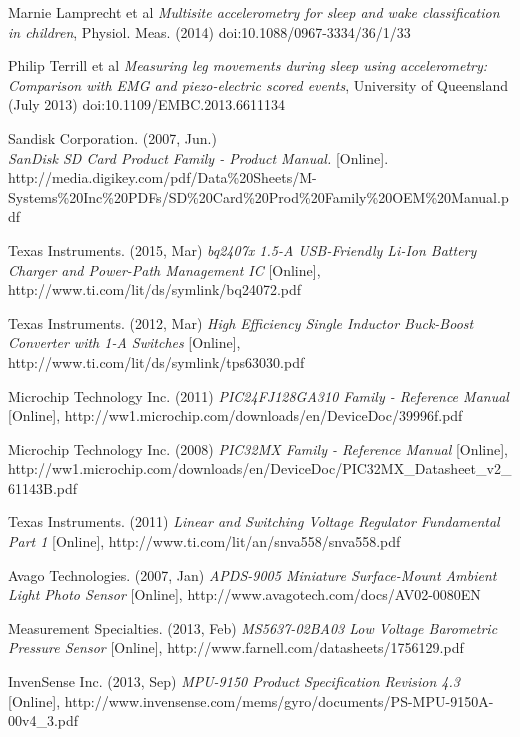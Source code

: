 \documentclass[12pt,openany,a4paper]{book}
\begin{document}
\begin{thebibliography}{99}
	Marnie Lamprecht et al
	\emph{Multisite accelerometry for sleep and wake classification in children},
	Physiol. Meas. (2014) doi:10.1088/0967-3334/36/1/33
	
	Philip Terrill et al
	\emph{Measuring leg movements during sleep using accelerometry: Comparison with EMG and piezo-electric scored events},
	University of Queensland (July 2013) doi:10.1109/EMBC.2013.6611134
	
	Sandisk Corporation. (2007, Jun.) \\
	\emph{SanDisk SD Card Product Family - Product Manual.} [Online].\\ http://media.digikey.com/pdf/Data\%20Sheets/M-Systems\%20Inc\%20PDFs/SD\%20Card\%20Prod\%20Family\%20OEM\%20Manual.pdf
	
	Texas Instruments. (2015, Mar) \emph{bq2407x 1.5-A USB-Friendly Li-Ion Battery Charger and Power-Path Management IC} [Online],
	http://www.ti.com/lit/ds/symlink/bq24072.pdf
	
	Texas Instruments. (2012, Mar) 
	\emph{High Efficiency Single Inductor Buck-Boost Converter with 1-A Switches} [Online],
	http://www.ti.com/lit/ds/symlink/tps63030.pdf
	
	Microchip Technology Inc. (2011) 
	\emph{PIC24FJ128GA310 Family - Reference Manual} [Online],
	http://ww1.microchip.com/downloads/en/DeviceDoc/39996f.pdf
	
	Microchip Technology Inc. (2008)
	\emph{PIC32MX Family - Reference Manual} [Online], http://ww1.microchip.com/downloads/en/DeviceDoc/PIC32MX\_Datasheet\_v2\_61143B.pdf
	
	Texas Instruments. (2011)
	\emph{Linear and Switching Voltage Regulator Fundamental Part 1} [Online], http://www.ti.com/lit/an/snva558/snva558.pdf
	
	Avago Technologies. (2007, Jan) 
	\emph{APDS-9005 Miniature Surface-Mount Ambient Light Photo Sensor} [Online],
	http://www.avagotech.com/docs/AV02-0080EN
	
	Measurement Specialties. (2013, Feb)
	\emph{MS5637-02BA03 Low Voltage Barometric Pressure Sensor}
	[Online],
	http://www.farnell.com/datasheets/1756129.pdf
	
	InvenSense Inc. (2013, Sep)
	\emph{MPU-9150 Product Specification Revision 4.3} [Online],
	http://www.invensense.com/mems/gyro/documents/PS-MPU-9150A-00v4\_3.pdf
	

\end{thebibliography}
\end{document}
